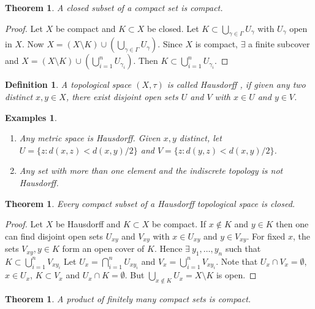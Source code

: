 \documentclass{notes}
\theoremstyle{plain}
\newtheorem{theorem}[proposition]{Theorem}
\newtheorem{definition}[proposition]{Definition}
\newtheorem*{examples}{Examples}
\begin{document}
\begin{theorem}
A closed subset of a compact set is compact.
\end{theorem}

\begin{proof}
Let $X$ be compact and $K \subset X$ be closed.  Let $K \subset
\bigcup_{\gamma \in \Gamma} U_\gamma$ with $U_\gamma$ open in $X$.  Now
$X = (X \setminus K) \cup \left( \bigcup_{\gamma \in \Gamma} U_\gamma \right)$.
Since $X$ is compact, $\exists$ a finite subcover and 
$X = (X \setminus K) \cup \left( \bigcup_{i=1}^n U_{\gamma_i} \right)$.  Then
$K \subset \bigcup_{i=1}^n U_{\gamma_i}$.
\end{proof}

\begin{definition}
A topological space $(X,\tau)$ is called Hausdorff%
, if given any two distinct
$x,y \in X$, there exist disjoint open sets $U$ and $V$ with $x \in U$ and
$y \in V$.
\end{definition}

\begin{examples}
\begin{enumerate}
\item Any metric space is Hausdorff.  Given $x,y$ distinct, let
$U = \{ z : d(x,z) < d(x,y)/2\}$ and $V = \{ z : d(y,z) < d(x,y)/2\}$.
\item Any set with more than one element and the indiscrete topology is
not Hausdorff.
\end{enumerate}
\end{examples}

\begin{theorem}
Every compact subset of a Hausdorff topological space is closed.
\end{theorem}

\begin{proof}
Let $X$ be Hausdorff and $K \subset X$ be compact.  If $x \notin K$ and
$y \in K$ then one can find disjoint open sets $U_{xy}$ and $V_{xy}$ with
$x \in U_{xy}$ and $y \in V_{xy}$.  For fixed $x$, the sets $V_{xy}, y \in
K$ form an open cover of $K$.  Hence $\exists\ y_1, \dots, y_n$ such that
$K \subset \bigcup_{i=1}^n V_{xy_i}$  Let $U_x = \bigcap_{i=1}^n U_{xy_i}$
and $V_x = \bigcup_{i=1}^n V_{xy_i}$.  Note that $U_x \cap V_x = \emptyset$,
$x \in U_x$, $K \subset V_x$ and $U_x \cap K = \emptyset$.  But
$\bigcup_{x \notin K} U_x = X \setminus K$ is open.
\end{proof}

\begin{theorem}
A product of finitely many compact sets is compact.
\end{theorem}
\end{document}
